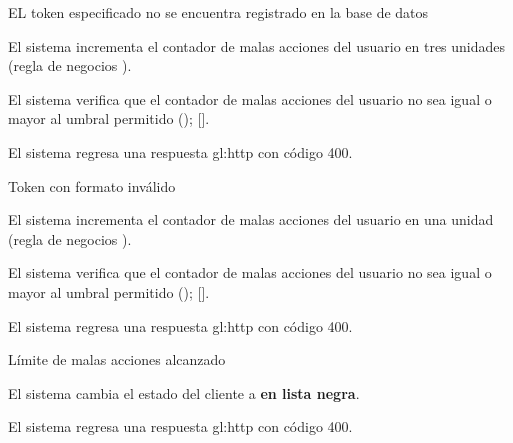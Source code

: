 {  %

  \begin{trayectoriaAlternativa}
    {EL token especificado no se encuentra registrado en la base de datos}

    \item El sistema incrementa el contador de malas acciones del usuario
      en tres unidades (regla de negocios
      ).

    \item El sistema verifica que el contador de malas acciones del usuario no
      sea igual o mayor al umbral permitido
      ();
      [].

    \item El sistema regresa una respuesta \gls{gl:http} con código 400.

  \end{trayectoriaAlternativa}


  \begin{trayectoriaAlternativa}
    {Token con formato inválido}

    \item El sistema incrementa el contador de malas acciones del usuario
      en una unidad (regla de negocios ).

    \item El sistema verifica que el contador de malas acciones del usuario no
      sea igual o mayor al umbral permitido
      ();
      [].

    \item El sistema regresa una respuesta \gls{gl:http} con código 400.

  \end{trayectoriaAlternativa}


  \begin{trayectoriaAlternativa}
    {Límite de malas acciones alcanzado}

    \item El sistema cambia el estado del cliente a \textbf{en lista negra}.

    \item El sistema regresa una respuesta \gls{gl:http} con código 400.

  \end{trayectoriaAlternativa}
}

